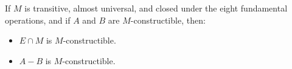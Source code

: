 If $M$ is transitive, almost universal, and closed under the eight fundamental operations, and if $A$ and $B$ are $M$-constructible, then:
\begin{itemize}
\item[(1)] $E \cap M$ is $M$-constructible.
\item[(2)] $A - B$ is $M$-constructible.
\end{itemize}
